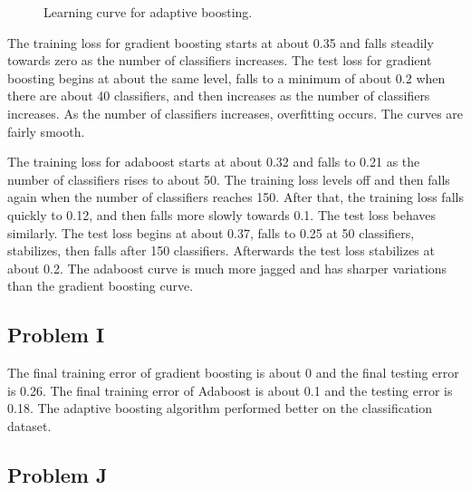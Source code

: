 \documentclass[12pt]{article} %
\begin{document}
\begin{figure}[H]
	\vspace{-10mm}
	\caption{Learning curve for adaptive boosting.}
\end{figure}

The training loss for gradient boosting starts at about 0.35 and falls steadily towards zero as the number of classifiers increases. The test loss for gradient boosting begins at about the same level, falls to a minimum of about 0.2 when there are about 40 classifiers, and then increases as the number of classifiers increases. As the number of classifiers increases, overfitting occurs. The curves are fairly smooth.

The training loss for adaboost starts at about 0.32 and falls to 0.21 as the number of classifiers rises to about 50. The training loss levels off and then falls again when the number of classifiers reaches 150. After that, the training loss falls quickly to 0.12, and then falls more slowly towards 0.1. The test loss behaves similarly. The test loss begins at about 0.37, falls to 0.25 at 50 classifiers, stabilizes, then falls after 150 classifiers. Afterwards the test loss stabilizes at about 0.2. The adaboost curve is much more jagged and has sharper variations than the gradient boosting curve.


\subsection{Problem I}
The final training error of gradient boosting is about 0 and the final testing error is 0.26. The final training error of Adaboost is about 0.1 and the testing error is 0.18. The adaptive boosting algorithm performed better on the classification dataset.

\subsection{Problem J}
\end{document}
